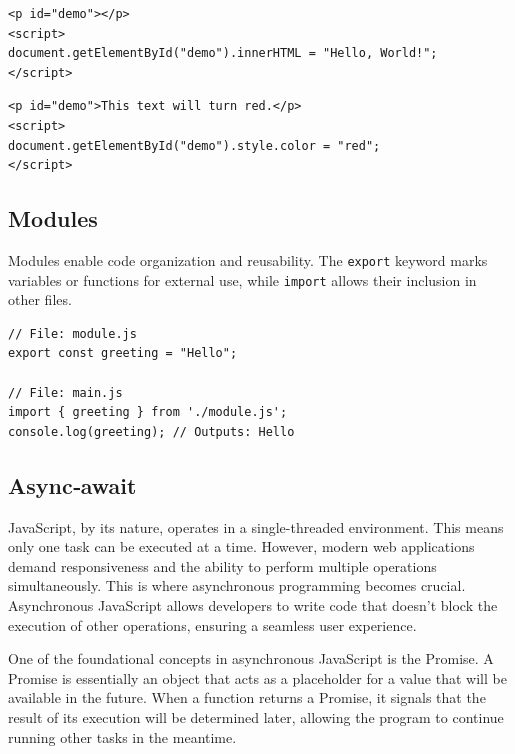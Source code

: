 \begin{verbatim}
<p id="demo"></p>
<script>
document.getElementById("demo").innerHTML = "Hello, World!";
</script>
\end{verbatim}

\begin{verbatim}
<p id="demo">This text will turn red.</p>
<script>
document.getElementById("demo").style.color = "red";
</script>
\end{verbatim}

\subsection*{Modules}
Modules enable code organization and reusability. The \texttt{export} keyword marks variables or functions for external use, while \texttt{import} allows their inclusion in other files.

\begin{verbatim}
// File: module.js
export const greeting = "Hello";

// File: main.js
import { greeting } from './module.js';
console.log(greeting); // Outputs: Hello
\end{verbatim}

\subsection*{Async‑await}
JavaScript, by its nature, operates in a single-threaded environment. This means only one task can be executed at a time. However, modern web applications demand responsiveness and the ability to perform multiple operations simultaneously. This is where asynchronous programming becomes crucial. Asynchronous JavaScript allows developers to write code that doesn't block the execution of other operations, ensuring a seamless user experience.

One of the foundational concepts in asynchronous JavaScript is the Promise. A Promise is essentially an object that acts as a placeholder for a value that will be available in the future. When a function returns a Promise, it signals that the result of its execution will be determined later, allowing the program to continue running other tasks in the meantime.


